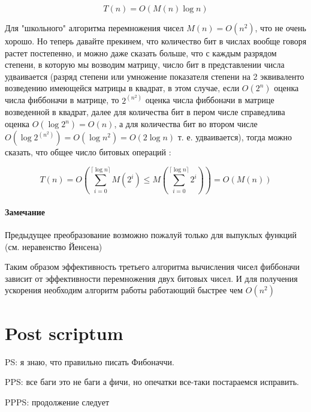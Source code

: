 \begin{equation}
	T(n) = O (M(n) \log n)
\end{equation}

Для "школьного" алгоритма перемножения чисел $M(n) = O (n^2)$, что не очень хорошо. Но теперь давайте прекинем, что количество бит в числах вообще говоря растет постепенно, и можно даже сказать больше, что с каждым разрядом степени, в которую мы возводим матрицу, число бит в представлении числа удваивается (разряд степени или умножение показателя степени на 2 эквиваленто возведению имеющейся матрицы в квадрат, в этом случае, если $O(2^{n})$ оценка числа фиббоначи в матрице, то $2^{(n^2)}$ оценка числа фиббоначи в матрице возведенной в квадрат, далее для количества бит в пером числе справедлива оценка $O(\log {2^n}) = O (n)$, а для количества бит во втором числе $O (\log {2^{(n^2)}}) = O (\log {n^2}) = O (2 \log n)$ т. е. удваивается), тогда можно сказать, что общее число битовых операций :

\begin{equation}
	T(n) = O \left( \sum_{i=0}^{\lceil \log n \rceil} M(2^i) \le M \left(\sum_{i=0}^{\lceil \log n \rceil} 2^i \right) \right) = O \left( M \left( n \right) \right)
\end{equation}

\paragraph{Замечание} Предыдущее преобразование возможно пожалуй только для выпуклых функций (см. неравенство Йенсена)

Таким образом эффективность третьего алгоритма вычисления чисел фиббоначи зависит от эффективности перемножения двух битовых чисел. И для получения ускорения необходим алгоритм работы работающий быстрее чем $O (n^2)$

\section{Post scriptum}

PS: я знаю, что правильно писать Фибоначчи.

PPS: все баги это не баги а фичи, но опечатки все-таки постараемся исправить.

PPPS: продолжение следует
